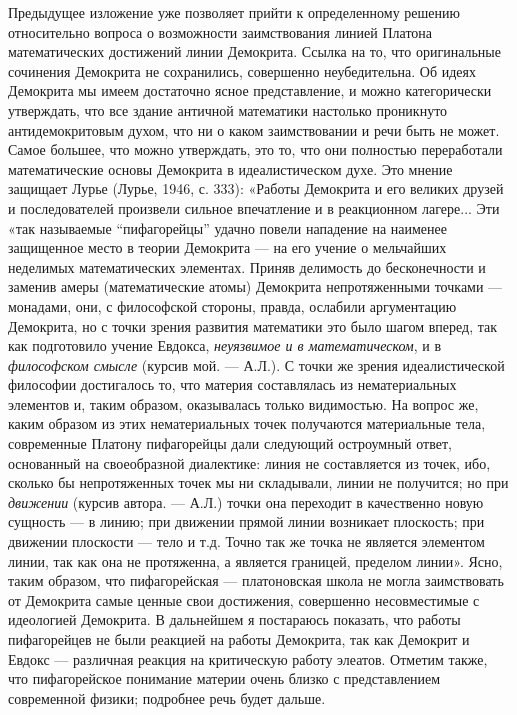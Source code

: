 Предыдущее   изложение   уже    позволяет   прийти   к   определенному
решению  относительно  вопроса   о  возможности  заимствования  линией
Платона  математических  достижений  линии Демокрита.  Ссылка  на  то,
что  оригинальные  сочинения   Демокрита  не  сохранились,  совершенно
неубедительна.   Об  идеях   Демокрита  мы   имеем  достаточно   ясное
представление,  и  можно  категорически  утверждать,  что  все  здание
античной математики  настолько проникнуто антидемокритовым  духом, что
ни  о  каком  заимствовании  и  речи быть  не  может.  Самое  большее,
что  можно   утверждать,  это  то,  что   они  полностью  переработали
математические  основы Демокрита  в идеалистическом  духе. Это  мнение
защищает Лурье (Лурье, 1946, с.  333): «Работы Демокрита и его великих
друзей и последователей произвели  сильное впечатление и в реакционном
лагере... Эти «так называемые  ``пифагорейцы'' удачно повели нападение
на  наименее защищенное  место в  теории Демокрита  --- на  его учение
о  мельчайших  неделимых  математических элементах.  Приняв  делимость
до  бесконечности и  заменив  амеры  (математические атомы)  Демокрита
непротяженными  точками  ---  монадами, они,  с  философской  стороны,
правда, ослабили  аргументацию Демокрита,  но с точки  зрения развития
математики это было шагом вперед,  так как подготовило учение Евдокса,
\emph{неуязвимое и  в математическом},  и в  \emph{философском смысле}
(курсив мой.  --- А.Л.). С  точки же зрения  идеалистической философии
достигалось то,  что материя составлялась из  нематериальных элементов
и, таким образом,  оказывалась только видимостью. На  вопрос же, каким
образом  из этих  нематериальных точек  получаются материальные  тела,
современные  Платону  пифагорейцы  дали  следующий  остроумный  ответ,
основанный на своеобразной диалектике: линия не составляется из точек,
ибо,  сколько  бы  непротяженных  точек мы  ни  складывали,  линии  не
получится; но при \emph{движении} (курсив  автора. --- А.Л.) точки она
переходит  в качественно  новую  сущность ---  в  линию; при  движении
прямой линии  возникает плоскость; при  движении плоскости ---  тело и
т.д. Точно  так же точка не  является элементом линии, так  как она не
протяженна, а является границей, пределом линии». Ясно, таким образом,
что  пифагорейская ---  платоновская  школа не  могла заимствовать  от
Демокрита  самые  ценные  свои  достижения,  совершенно  несовместимые
с  идеологией  Демокрита.  В  дальнейшем я  постараюсь  показать,  что
работы  пифагорейцев не  были реакцией  на работы  Демокрита, так  как
Демокрит и Евдокс --- различная реакция на критическую работу элеатов.
Отметим  также, что  пифагорейское  понимание материи  очень близко  с
представлением современной физики; подробнее речь будет дальше.

